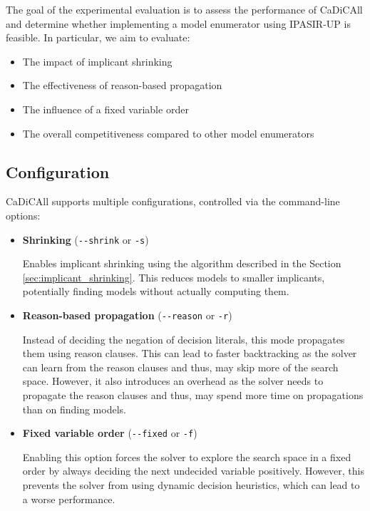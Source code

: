 \documentclass[12pt,a4paper]{article}
\begin{document}
The goal of the experimental evaluation is to assess the performance of CaDiCAll and determine whether implementing a model enumerator using IPASIR-UP is feasible. In particular, we aim to evaluate:

\begin{itemize}
    \item The impact of implicant shrinking
    \item The effectiveness of reason-based propagation
    \item The influence of a fixed variable order
    \item The overall competitiveness compared to other model enumerators
\end{itemize}

\subsection{Configuration}

CaDiCAll supports multiple configurations, controlled via the command-line options:

\begin{itemize}

\item \textbf{Shrinking} (\verb|--shrink| or \verb|-s|)

Enables implicant shrinking using the algorithm described in the Section \ref{sec:implicant_shrinking}. This reduces models to smaller implicants, potentially finding models without actually computing them.

\item \textbf{Reason-based propagation} (\verb|--reason| or \verb|-r|)

Instead of deciding the negation of decision literals, this mode propagates them using reason clauses. This can lead to faster backtracking as the solver can learn from the reason clauses and thus, may skip more of the search space. However, it also introduces an overhead as the solver needs to propagate the reason clauses and thus, may spend more time on propagations than on finding models.

\item \textbf{Fixed variable order} (\verb|--fixed| or \verb|-f|)

Enabling this option forces the solver to explore the search space in a fixed order by always deciding the next undecided variable positively. However, this prevents the solver from using dynamic decision heuristics, which can lead to a worse performance.
\end{itemize}
\end{document}
